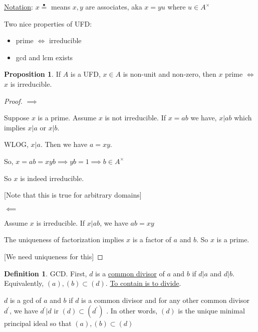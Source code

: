 \documentclass{article}
\theoremstyle{definition}
\newtheorem{definition}{Definition}
\newtheorem{proposition}{Proposition}
\begin{document}
\underline{Notation}: \(x \overset{\bullet}{=} \) means \(x,y\) are associates, aka \(x=yu\) where \(u \in A^\times\)  

Two nice properties of UFD:

\begin{itemize}
    \item prime \(\iff \) irreducible
    \item gcd and lcm exists
\end{itemize}

\begin{proposition}
    If \(A\) is a UFD, \(x\in A\) is non-unit and non-zero, then \(x\) prime \(\iff \) \(x\) is irreducible.
\end{proposition}

\begin{proof}
    \(\implies \)
    
    Suppose \(x\) is a prime. Assume \(x\) is not irreducible. If \(x=ab\) we have,
    \(x \vert ab\) which implies \(x \vert a\) or \(x \vert b\).

    WLOG, \(x \vert a\). Then we have \(a = xy\).
    
    So, \(x = ab = xyb \implies yb = 1 \implies b\in A^\times\)
    
    So \(x\) is indeed irreducible.

    [Note that this is true for arbitrary domains]

    \(\impliedby \) 

    Assume \(x\) is irreducible. If \(x \vert ab\), we have \(ab=xy\)
    
    The uniqueness of factorization implies \(x\) is a factor of \(a\) and \(b\). So \(x\) is a prime.

    [We need uniqueness for this]
    
\end{proof}

\begin{definition}
    GCD. First, \(d\) is a \underline{common divisor} of \(a\) and \(b\) if \(d\vert a\) and \(d\vert b\). Equivalently, \((a),(b) \subset (d)\). \underline{To contain is to divide}.

    \(d\) is a gcd of \(a\) and \(b\) if \(d\) is a common divisor and for any other common divisor \(d^{\prime} \), we have \(d^{\prime} \vert d\) ir \((d)\subset (d^{\prime})\) . In other words, \((d)\) is the unique minimal principal ideal so that \((a),(b)\subset (d)\) 
\end{definition}
\end{document}
